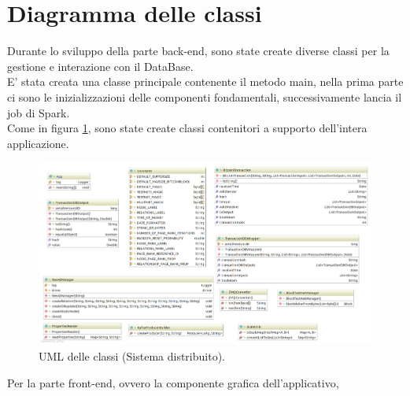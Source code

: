 \section{Diagramma delle classi}
\label{sec:diagramma delle classi}
Durante lo sviluppo della parte back-end, sono state create diverse classi per la gestione e interazione con il DataBase. 
\\ E' stata creata una classe principale contenente il metodo main, nella prima parte ci sono le inizializzazioni delle  componenti fondamentali, successivamente lancia il job di Spark.
\\ Come in figura \ref{fig:UMLSD}, sono state create classi contenitori a supporto dell'intera applicazione. 

\begin{figure}
	\centering
	\includegraphics[width=\textwidth]{images/AppUML.png}
	\caption{UML delle classi (Sistema distribuito).}
	\label{fig:UMLSD}
\end{figure}
 
Per la parte front-end, ovvero la componente grafica dell'applicativo, 